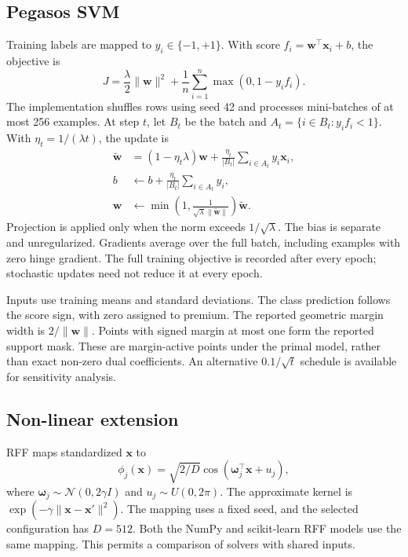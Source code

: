\documentclass[10pt,twocolumn,a4paper]{article}
\begin{document}
\subsection{Pegasos SVM}
Training labels are mapped to $y_i\in\{-1,+1\}$. With score $f_i=\mathbf w^\top\mathbf x_i+b$, the objective is
\begin{equation}\label{eq:objective}
J=\frac{\lambda}{2}\|\mathbf w\|^2+
\frac{1}{n}\sum_{i=1}^n\max(0,1-y_i f_i).
\end{equation}
The implementation shuffles rows using seed 42 and processes mini-batches of at most 256 examples. At step $t$, let $B_t$ be the batch and $A_t=\{i\in B_t:y_i f_i<1\}$. With $\eta_t=1/(\lambda t)$, the update is
\begin{align}
\widetilde{\mathbf w}&=(1-\eta_t\lambda)\mathbf w+
 \frac{\eta_t}{|B_t|}\sum_{i\in A_t}y_i\mathbf x_i,\\
b&\leftarrow b+\frac{\eta_t}{|B_t|}\sum_{i\in A_t}y_i,\\
\mathbf w&\leftarrow\min\left(1,\frac{1}{\sqrt{\lambda}\|\widetilde{\mathbf w}\|}\right)\widetilde{\mathbf w}.
\end{align}
Projection is applied only when the norm exceeds $1/\sqrt{\lambda}$. The bias is separate and unregularized. Gradients average over the full batch, including examples with zero hinge gradient. The full training objective is recorded after every epoch; stochastic updates need not reduce it at every epoch.

Inputs use training means and standard deviations. The class prediction follows the score sign, with zero assigned to premium. The reported geometric margin width is $2/\|\mathbf w\|$. Points with signed margin at most one form the reported support mask. These are margin-active points under the primal model, rather than exact non-zero dual coefficients. An alternative $0.1/\sqrt{t}$ schedule is available for sensitivity analysis.

\subsection{Non-linear extension}
RFF maps standardized $\mathbf x$ to
\begin{equation}
\phi_j(\mathbf x)=\sqrt{2/D}\cos(\boldsymbol\omega_j^\top\mathbf x+u_j),
\end{equation}
where $\boldsymbol\omega_j\sim\mathcal N(0,2\gamma I)$ and $u_j\sim U(0,2\pi)$. The approximate kernel is $\exp(-\gamma\|\mathbf x-\mathbf x'\|^2)$. The mapping uses a fixed seed, and the selected configuration has $D=512$. Both the NumPy and scikit-learn RFF models use the same mapping. This permits a comparison of solvers with shared inputs.
\end{document}

